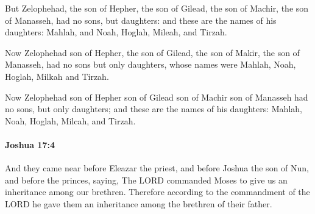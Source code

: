 			\begin{versebox}
					\item[BHS] 
					\item[ASV] But Zelophehad, the son of Hepher, the son of Gilead, the son of Machir, the son of Manasseh, had no sons, but daughters: and these are the names of his daughters: Mahlah, and Noah, Hoglah, Mileah, and Tirzah.
					\item[NIV] Now Zelophehad son of Hepher, the son of Gilead, the son of Makir, the son of Manasseh, had no sons but only daughters, whose names were Mahlah, Noah, Hoglah, Milkah and Tirzah.
					\item[NRSV] Now Zelophehad son of Hepher son of Gilead son of Machir son of Manasseh had no sons, but only daughters; and these are the names of his daughters: Mahlah, Noah, Hoglah, Milcah, and Tirzah.
			\end{versebox}

		\paragraph{Joshua 17:4} %
			\label{JOSHUA-17-4}

			And they came near before Eleazar the priest, and before Joshua the son of Nun, and before the princes, saying, The LORD commanded Moses to give us an inheritance among our brethren. Therefore according to the commandment of the LORD he gave them an inheritance among the brethren of their father.

